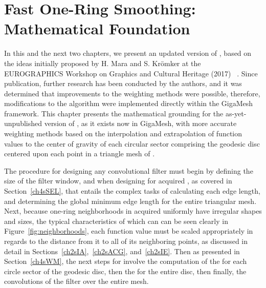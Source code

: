 \chapter{Fast One-Ring Smoothing: Mathematical Foundation}
\label{ch4}
In this and the next two chapters, we present an updated version of , based on the ideas initially proposed by H. Mara and S. Krömker at the EUROGRAPHICS Workshop on Graphics and Cultural Heritage (2017) ~\cite[s.~3.2]{Mara17}. Since publication, further research has been conducted by the authors, and it was determined that improvements to the weighting methods were possible, therefore, modifications to the algorithm were implemented directly within the GigaMesh  framework. This chapter presents the mathematical grounding for the as-yet-unpublished version of , as it exists now in GigaMesh, with more accurate weighting methods based on the interpolation and extrapolation of function values to the center of gravity of each circular sector comprising the geodesic disc centered upon each point in a triangle mesh of \tdd{}.

The procedure for designing any convolutional filter must begin by defining the size of the filter window, and when designing for acquired \tdd{}, as covered in Section~\ref{ch4sSEL}, that entails the complex tasks of calculating each edge length, and determining the global minimum edge length for the entire triangular mesh. Next, because one-ring neighborhoods in acquired \tdd{} uniformly have irregular shapes and sizes, the typical characteristics of which can can be seen clearly in Figure~\ref{fig:neighborhoods}, each function value must be scaled appropriately in regards to the distance from it to all of its neighboring points, as discussed in detail in Sections~\ref{ch2sIA},~\ref{ch2sACG}, and~\ref{ch2sIE}. Then as presented in Section~\ref{ch4sWM}, the next steps for  involve the computation of the  for each circle sector of the geodesic disc, then the \wmfv{} for the entire disc, then finally, the convolutions of the filter over the entire mesh.

%
%
%
%
